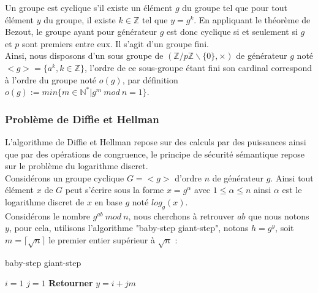 Un groupe est cyclique s'il existe un élément $g$ du groupe tel que pour tout élément $y$ du groupe, il existe $k\in \mathbb{Z}$ tel que $y=g^k$. En appliquant le théorème de Bezout, le groupe ayant pour générateur $g$ est donc cyclique si et seulement si $g$ et $p$ sont premiers entre eux. Il s'agit d'un groupe fini.\\

Ainsi, nous disposons d'un sous groupe de $(\mathbb{Z}/p\mathbb{Z} \backslash \{0\}, \times)$ de générateur $g$ noté $<g>=\{a^k,k\in \mathbb{Z} \}$, l'ordre de ce sous-groupe étant fini son cardinal correspond à l'ordre du groupe noté $o (g)$,\cite{ellipses_groupes_nodate} par définition $o(g):=min\{ m \in \mathbb{N^*}|g^m \: mod \: n = 1 \}$.\\

\subsubsection{Problème de Diffie et Hellman}
L'algorithme de Diffie et Hellman repose sur des calculs par des puissances ainsi que par des opérations de congruence, le principe de sécurité sémantique repose sur le problème du logarithme discret.\\

Considérons un groupe cyclique $G=<g>$ d'ordre $n$ de générateur $g$. Ainsi tout élément $x$ de $G$ peut s'écrire sous la forme $x=g^\alpha$ avec $1\leq \alpha \leq n$ ainsi $\alpha$ est le logarithme discret de $x$ en base $g$ noté $log_g(x)$.\\

Considérons le nombre $g^{ab} \: mod  \: n$, nous cherchons à retrouver $ab$ que nous notons $y$, pour cela, utilisons l'algorithme "baby-step giant-step"\cite{gluher_probleme_nodate}, notons $h=g^y$, soit $m=\lceil \sqrt{n} \rceil$ le premier entier supérieur à $\sqrt{n}$ :

\begin{algorithm}[H]

    \caption{baby-step giant-step}

    
    $i = 1$\;
    $j = 1$\;
    \textbf{Retourner} $y = i+jm$\;
    
\end{algorithm}

